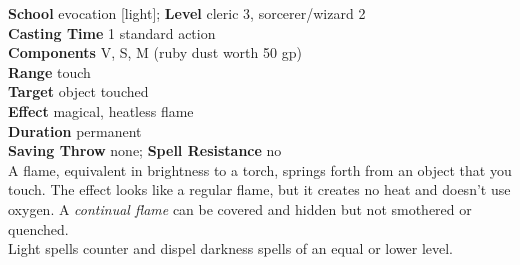 \textbf{School} evocation [light]; \textbf{Level} cleric 3, sorcerer/wizard 2\\
\textbf{Casting Time} 1 standard action\\
\textbf{Components} V, S, M (ruby dust worth 50 gp)\\
\textbf{Range} touch\\
\textbf{Target} object touched\\
\textbf{Effect }magical, heatless flame\\
\textbf{Duration} permanent\\
\textbf{Saving Throw} none; \textbf{Spell Resistance} no\\
A flame, equivalent in brightness to a torch, springs forth from an object that you touch. The effect looks like a regular flame, but it creates no heat and doesn't use oxygen. A \textit{continual flame }can be covered and hidden but not smothered or quenched.\\
Light spells counter and dispel darkness spells of an equal or lower level.\\
